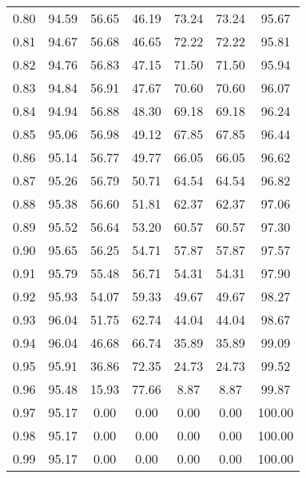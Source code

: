 \begin{tabular}{|c|c|c|c|c|c|c|}
      0.80 &     94.59 &     56.65 &      46.19 &   73.24 &      73.24 &         95.67 \\
      0.81 &     94.67 &     56.68 &      46.65 &   72.22 &      72.22 &         95.81 \\
      0.82 &     94.76 &     56.83 &      47.15 &   71.50 &      71.50 &         95.94 \\
      0.83 &     94.84 &     56.91 &      47.67 &   70.60 &      70.60 &         96.07 \\
      0.84 &     94.94 &     56.88 &      48.30 &   69.18 &      69.18 &         96.24 \\
      0.85 &     95.06 &     56.98 &      49.12 &   67.85 &      67.85 &         96.44 \\
      0.86 &     95.14 &     56.77 &      49.77 &   66.05 &      66.05 &         96.62 \\
      0.87 &     95.26 &     56.79 &      50.71 &   64.54 &      64.54 &         96.82 \\
      0.88 &     95.38 &     56.60 &      51.81 &   62.37 &      62.37 &         97.06 \\
      0.89 &     95.52 &     56.64 &      53.20 &   60.57 &      60.57 &         97.30 \\
      0.90 &     95.65 &     56.25 &      54.71 &   57.87 &      57.87 &         97.57 \\
      0.91 &     95.79 &     55.48 &      56.71 &   54.31 &      54.31 &         97.90 \\
      0.92 &     95.93 &     54.07 &      59.33 &   49.67 &      49.67 &         98.27 \\
      0.93 &     96.04 &     51.75 &      62.74 &   44.04 &      44.04 &         98.67 \\
      0.94 &     96.04 &     46.68 &      66.74 &   35.89 &      35.89 &         99.09 \\
      0.95 &     95.91 &     36.86 &      72.35 &   24.73 &      24.73 &         99.52 \\
      0.96 &     95.48 &     15.93 &      77.66 &    8.87 &       8.87 &         99.87 \\
      0.97 &     95.17 &      0.00 &       0.00 &    0.00 &       0.00 &        100.00 \\
      0.98 &     95.17 &      0.00 &       0.00 &    0.00 &       0.00 &        100.00 \\
      0.99 &     95.17 &      0.00 &       0.00 &    0.00 &       0.00 &        100.00 \\
\bottomrule
\end{tabular}
